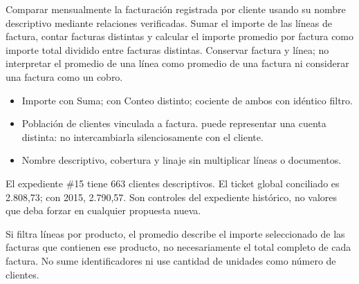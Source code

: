 \label{wwi04}
\begin{goal}
Comparar mensualmente la facturación registrada por cliente usando su nombre descriptivo mediante relaciones verificadas. Sumar el importe de las líneas de factura, contar facturas distintas y calcular el importe promedio por factura como importe total dividido entre facturas distintas. Conservar factura y línea; no interpretar el promedio de una línea como promedio de una factura ni considerar una factura como un cobro.
\end{goal}
\begin{itemize}
\item Importe con Suma;  con Conteo distinto; cociente de ambos con idéntico filtro.
\item Población de clientes vinculada a factura.  puede representar una cuenta distinta: no intercambiarla silenciosamente con el cliente.
\item Nombre descriptivo, cobertura y linaje sin multiplicar líneas o documentos.
\end{itemize}
\begin{good}
El expediente \#15 tiene 663 clientes descriptivos. El ticket global conciliado es 2.808,73; con 2015, 2.790,57. Son controles del expediente histórico, no valores que deba forzar en cualquier propuesta nueva.
\end{good}
\begin{note}
Si filtra líneas por producto, el promedio describe el importe seleccionado de las facturas que contienen ese producto, no necesariamente el total completo de cada factura. No sume identificadores ni use cantidad de unidades como número de clientes.
\end{note}

